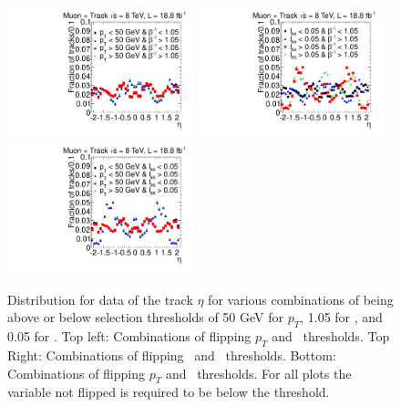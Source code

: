 \begin{figure}
\begin{center}
\includegraphics[clip=false, trim=0.0cm 0cm 0.0cm 0cm, width=0.48\textwidth]{figures/tkmu/Selection_Data8TeV_EtaRegionsPtTOF_016}
\includegraphics[clip=false, trim=0.0cm 0cm 0.0cm 0cm, width=0.48\textwidth]{figures/tkmu/Selection_Data8TeV_EtaRegionsTOFdEdx_016} \\
\includegraphics[clip=false, trim=0.0cm 0cm 0.0cm 0cm, width=0.48\textwidth]{figures/tkmu/Selection_Data8TeV_EtaRegionsPtdEdx_016}
\end{center}
\caption[Distribution for data of the track $\eta$ for various combinations of being above or below selection thresholds in the \tktof\ analysis]
{Distribution for data of the track $\eta$ for various combinations of being above or below selection thresholds of
50 GeV for $p_T$, 1.05 for \invbeta, and 0.05 for \ias.
Top left: Combinations of flipping $p_T$ and \invbeta\ thresholds. Top Right: Combinations of flipping \invbeta\ and \ias\ thresholds.
Bottom: Combinations of flipping $p_T$ and \ias\ thresholds. For all plots the variable not flipped is required to be below the threshold.}
\label{fig:etacorrelation}
\end{figure}

